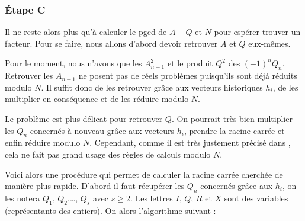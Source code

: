 \documentclass[a4paper]{article} %
\numberwithin{equation}{section}
\begin{document}
\subsubsection{Étape C}
Il ne reste alors plus qu'à calculer le pgcd de $A-Q$ et $N$ pour espérer trouver un facteur. Pour se faire, nous allons d'abord devoir retrouver $A$ et $Q$ eux-mêmes.\par
Pour le moment, nous n'avons que les $A_{n-1}^2$ et le produit $Q^2$ des $(-1)^nQ_n$. Retrouver les $A_{n-1}$ ne posent pas de réels problèmes puisqu'ils sont déjà réduits modulo $N$. Il suffit donc de les retrouver grâce aux vecteurs historiques $h_i$, de les multiplier en conséquence et de les réduire modulo $N$.\\\par
Le problème est plus délicat pour retrouver $Q$. On pourrait très bien multiplier les $Q_n$ concernés à nouveau grâce aux vecteurs $h_i$, prendre la racine carrée et enfin réduire modulo $N$. Cependant, comme il est très justement précisé dans \cite[Section 2, step C]{AMFF}, cela ne fait pas grand usage des règles de calculs modulo $N$.\par
Voici alors une procédure qui permet de calculer la racine carrée cherchée de manière plus rapide. D'abord il faut récupérer les $Q_n$ concernés grâce aux $h_i$, on les notera $Q_1$, $Q_2$,\dots, $Q_s$ avec $s\geq2$. Les lettres $I$, $\bar{Q}$, $R$ et $X$ sont des variables (représentants des entiers). On alors l'algorithme suivant :
\end{document}
